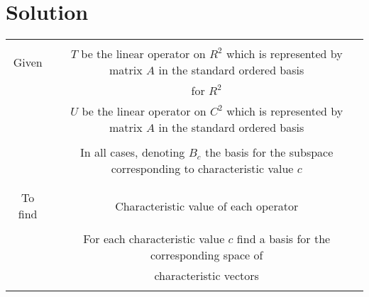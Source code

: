 \documentclass[journal,12pt,twocolumn]{IEEEtran}
\begin{document}
\section{\textbf{Solution}}
\begin{table}[h!]
\begin{center}
\begin{tabular}{|c|c|}
\hline
& \\
Given & $T$ be the linear operator on $R^2$ which is represented by matrix $A$ in the standard ordered basis\\
& for $R^2$\\
& $U$ be the linear operator on $C^2$ which is represented by matrix $A$ in the standard ordered basis\\
&\\
& In all cases, denoting $B_c$ the basis for the subspace corresponding to characteristic value $c$ \\
& \\
\hline
& \\
To find & Characteristic value of each operator\\
& \\
& For each characteristic value $c$ find a basis for the corresponding space of\\
& characteristic vectors \\
& \\
\hline
\end{tabular}
\end{center}
\end{table}
\end{document}
